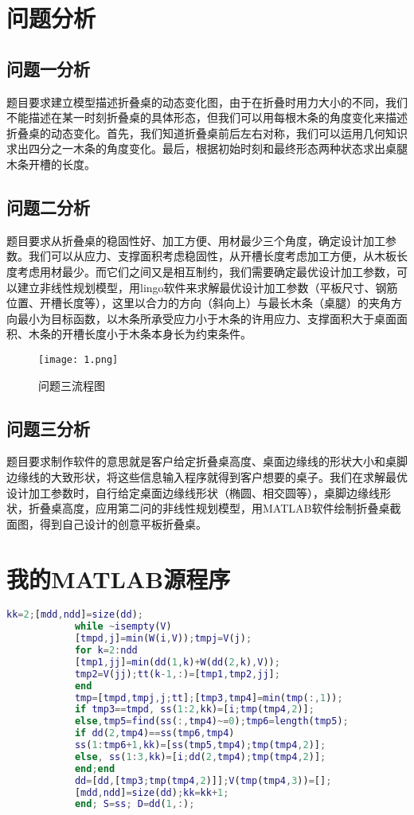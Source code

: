 \documentclass[bwprint]{gmcmthesis}
\begin{document}
	
	\section{问题分析}
		
		\subsection{问题一分析}
		题目要求建立模型描述折叠桌的动态变化图，由于在折叠时用力大小的不同，我们不能描述在某一时刻折叠桌的具体形态，但我们可以用每根木条的角度变化来描述折叠桌的动态变化。首先，我们知道折叠桌前后左右对称，我们可以运用几何知识求出四分之一木条的角度变化。最后，根据初始时刻和最终形态两种状态求出桌腿木条开槽的长度。
		
		\subsection{问题二分析}
		题目要求从折叠桌的稳固性好、加工方便、用材最少三个角度，确定设计加工参数。我们可以从应力、支撑面积考虑稳固性，从开槽长度考虑加工方便，从木板长度考虑用材最少。而它们之间又是相互制约，我们需要确定最优设计加工参数，可以建立非线性规划模型\cite{vieth_experiences_2009}，用lingo软件来求解最优设计加工参数（平板尺寸、钢筋位置、开槽长度等），这里以合力的方向（斜向上）与最长木条（桌腿）的夹角方向最小为目标函数\cite{}，以木条所承受应力小于木条的许用应力、支撑面积大于桌面面积、木条的开槽长度小于木条本身长为约束条件。
		
		\begin{figure}[!h]
			\centering
			\texttt{[image: 1.png]}
			\caption{问题三流程图}
		\end{figure}
	
		\subsection{问题三分析}
		题目要求制作软件的意思就是客户给定折叠桌高度、桌面边缘线的形状大小和桌脚边缘线的大致形状，将这些信息输入程序就得到客户想要的桌子。我们在求解最优设计加工参数时，自行给定桌面边缘线形状（椭圆、相交圆等），桌脚边缘线形状，折叠桌高度，应用第二问的非线性规划模型，用MATLAB软件绘制折叠桌截面图，得到自己设计的创意平板折叠桌。
		
	
	
	
	
	\newpage
	\appendix
	
		\section{我的MATLAB源程序}
		\begin{lstlisting}[language = Matlab]
			kk=2;[mdd,ndd]=size(dd);
			while ~isempty(V)
			[tmpd,j]=min(W(i,V));tmpj=V(j);
			for k=2:ndd
			[tmp1,jj]=min(dd(1,k)+W(dd(2,k),V));
			tmp2=V(jj);tt(k-1,:)=[tmp1,tmp2,jj];
			end
			tmp=[tmpd,tmpj,j;tt];[tmp3,tmp4]=min(tmp(:,1));
			if tmp3==tmpd, ss(1:2,kk)=[i;tmp(tmp4,2)];
			else,tmp5=find(ss(:,tmp4)~=0);tmp6=length(tmp5);
			if dd(2,tmp4)==ss(tmp6,tmp4)
			ss(1:tmp6+1,kk)=[ss(tmp5,tmp4);tmp(tmp4,2)];
			else, ss(1:3,kk)=[i;dd(2,tmp4);tmp(tmp4,2)];
			end;end
			dd=[dd,[tmp3;tmp(tmp4,2)]];V(tmp(tmp4,3))=[];
			[mdd,ndd]=size(dd);kk=kk+1;
			end; S=ss; D=dd(1,:);
		\end{lstlisting}
	
\end{document}
